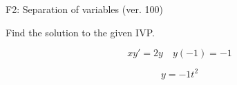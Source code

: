 \begin{exercise}
  \begin{exerciseTitle}F2: Separation of variables (ver. 100)\end{exerciseTitle}
  \begin{exerciseStatement}
    
Find the solution to the given IVP.

    
\[xy'= 2 y \hspace{1em} y( -1 ) = -1\]

  \end{exerciseStatement}
  \begin{exerciseAnswer}
    
\[y= -1 t^ 2\]

  \end{exerciseAnswer}
\end{exercise}